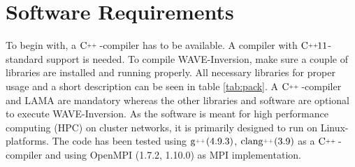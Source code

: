 \documentclass[pdftex,a4paper,parskip,listof=totoc,bibliography=totoc,onehalfspacing,12pt]{scrreprt}
\newcommand{\CC}[1][]{$\text{C\hspace{0ex}}^{_{_{_{++}}}}					%
                      \ifthenelse{\equal{#1}{}}{}{\text{\hspace{-.625ex}#1}}$}
\newcommand{\clang}[1][]{$\text{clang\hspace{0ex}}^{_{_{_{++}}}}		%
                      \ifthenelse{\equal{#1}{}}{}{\text{\hspace{-.25ex}(#1)}}$}
\newcommand{\gCC}[1][]{$\text{g\hspace{0ex}}^{_{_{_{++}}}}				%
                      \ifthenelse{\equal{#1}{}}{}{\text{\hspace{-.25ex}(#1)}}$}
\begin{document}
\section{Software Requirements}

To begin with, a \CC-compiler has to be available. A compiler with  \CC[11]-standard support is needed. To compile WAVE-Inversion, make sure a couple of libraries are installed and running properly. All necessary libraries for proper usage and a short description can be seen in table \ref{tab:pack}. A \CC-compiler and LAMA are mandatory whereas the other libraries and software are optional to execute WAVE-Inversion.
As the software is meant for high performance computing (HPC) on cluster networks, it is primarily designed to run on Linux-platforms. The code has been tested using \gCC[4.9.3], \clang[3.9] as a  \CC-compiler and using OpenMPI (1.7.2, 1.10.0) as MPI implementation.
\end{document}
